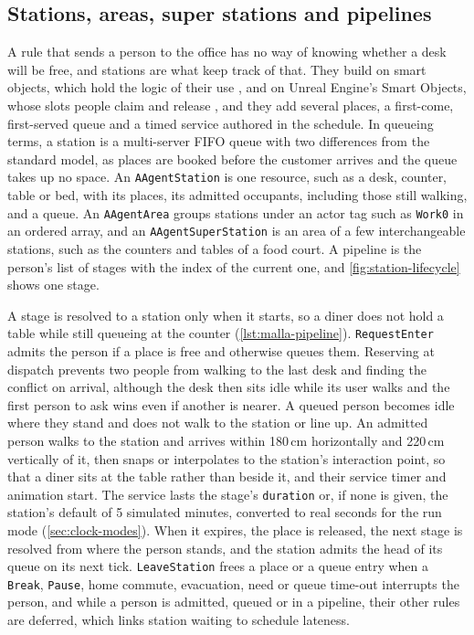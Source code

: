 \subsection{Stations, areas, super stations and pipelines}
\label{sec:stations}

A rule that sends a person to the office has no way of knowing whether a desk will be free, and stations are what keep track of that. They build on smart objects, which hold the logic of their use \citep{kallmann1999modeling,forbus2001notes}, and on Unreal Engine's Smart Objects, whose slots people claim and release \citep{epicgames2026smartobjects}, and they add several places, a first-come, first-served queue and a timed service authored in the schedule. In queueing terms, a station is a multi-server FIFO queue \citep{kendall1953stochastic,shortle2018fundamentals} with two differences from the standard model, as places are booked before the customer arrives and the queue takes up no space. An \texttt{AAgentStation} is one resource, such as a desk, counter, table or bed, with its places, its admitted occupants, including those still walking, and a queue. An \texttt{AAgentArea} groups stations under an actor tag such as \texttt{Work0} in an ordered array, and an \texttt{AAgentSuperStation} is an area of a few interchangeable stations, such as the counters and tables of a food court. A pipeline is the person's list of stages with the index of the current one, and \cref{fig:station-lifecycle} shows one stage.

A stage is resolved to a station only when it starts, so a diner does not hold a table while still queueing at the counter (\cref{lst:malla-pipeline}). \texttt{RequestEnter} admits the person if a place is free and otherwise queues them. Reserving at dispatch prevents two people from walking to the last desk and finding the conflict on arrival, although the desk then sits idle while its user walks and the first person to ask wins even if another is nearer. A queued person becomes idle where they stand and does not walk to the station or line up. An admitted person walks to the station and arrives within 180\,cm horizontally and 220\,cm vertically of it, then snaps or interpolates to the station's interaction point, so that a diner sits at the table rather than beside it, and their service timer and animation start. The service lasts the stage's \texttt{duration} or, if none is given, the station's default of 5 simulated minutes, converted to real seconds for the run mode (\cref{sec:clock-modes}). When it expires, the place is released, the next stage is resolved from where the person stands, and the station admits the head of its queue on its next tick. \texttt{LeaveStation} frees a place or a queue entry when a \texttt{Break}, \texttt{Pause}, home commute, evacuation, need or queue time-out interrupts the person, and while a person is admitted, queued or in a pipeline, their other rules are deferred, which links station waiting to schedule lateness.


